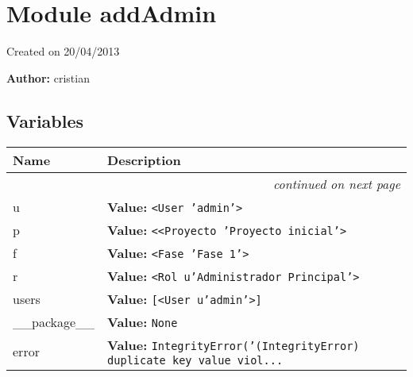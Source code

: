 %
%
%


\section{Module addAdmin}

    \label{addAdmin}
Created on 20/04/2013

\textbf{Author:} cristian





  \subsection{Variables}

    \vspace{-1cm}
\hspace{\varindent}\begin{longtable}{|p{\varnamewidth}|p{\vardescrwidth}|l}
\cline{1-2}
\cline{1-2} \centering \textbf{Name} & \centering \textbf{Description}& \\
\cline{1-2}
\endhead\cline{1-2}\multicolumn{3}{r}{\small\textit{continued on next page}}\\\endfoot\cline{1-2}
\endlastfoot\raggedright u\- & \raggedright \textbf{Value:} 
{\tt {\textless}User 'admin'{\textgreater}}&\\
\cline{1-2}
\raggedright p\- & \raggedright \textbf{Value:} 
{\tt {\textless}{\textless}Proyecto 'Proyecto inicial'{\textgreater}}&\\
\cline{1-2}
\raggedright f\- & \raggedright \textbf{Value:} 
{\tt {\textless}Fase 'Fase 1'{\textgreater}}&\\
\cline{1-2}
\raggedright r\- & \raggedright \textbf{Value:} 
{\tt {\textless}Rol u'Administrador Principal'{\textgreater}}&\\
\cline{1-2}
\raggedright u\-s\-e\-r\-s\- & \raggedright \textbf{Value:} 
{\tt \texttt{[}{\textless}User u'admin'{\textgreater}\texttt{]}}&\\
\cline{1-2}
\raggedright \_\-\_\-p\-a\-c\-k\-a\-g\-e\-\_\-\_\- & \raggedright \textbf{Value:} 
{\tt None}&\\
\cline{1-2}
\raggedright e\-r\-r\-o\-r\- & \raggedright \textbf{Value:} 
{\tt IntegrityError('(IntegrityError) duplicate key value viol\texttt{...}}&\\
\cline{1-2}
\end{longtable}

